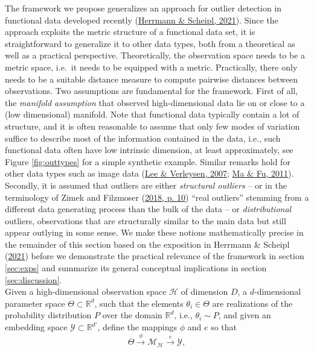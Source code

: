 \documentclass[
  10pt]{article}
\newcommand{\hdspace}{\mathcal{H}}
\newcommand{\embedspace}{\mathcal{Y}}
\newcommand{\pspace}{\Theta}
\newcommand{\mani}{\mathcal{M}}
\newcommand{\obsdim}{\ensuremath{D}}    %
\begin{document}
The framework we propose generalizes an approach for outlier detection in functional data developed recently (\protect\hyperlink{ref-herrmann2021geometric}{Herrmann \& Scheipl, 2021}).
Since the approach exploits the metric structure of a functional data set,
it is straightforward to generalize it to other data types, both from a theoretical as well as a practical perspective. Theoretically, the observation space needs to be a metric space, i.e.~it needs to be equipped with a metric. Practically, there only needs to be a suitable distance measure to compute pairwise distances between observations.
Two assumptions are fundamental for the framework. First of all, the \emph{manifold assumption} that observed high-dimensional data lie on or close to a (low dimensional) manifold.
Note that functional data typically contain a lot of structure, and it is often reasonable to assume that only few modes of variation suffice to describe most of the information contained in the data, i.e., such functional data often have low intrinsic dimension, at least approximately, see Figure \ref{fig:outtypes} for a simple synthetic example. Similar remarks hold for other data types such as image data (\protect\hyperlink{ref-lee2007nonlinear}{Lee \& Verleysen, 2007}; \protect\hyperlink{ref-ma2011manifold}{Ma \& Fu, 2011}). Secondly, it is assumed that outliers are either \emph{structural outliers} -- or in the terminology of Zimek and Filzmoser (\protect\hyperlink{ref-zimek2018there}{2018, p. 10}) ``real outliers'' stemming from a different data generating process than the bulk of the data -- or \emph{distributional} outliers, observations that are structurally similar to the main data but still appear outlying in some sense. We make these notions mathematically precise in the remainder of this section based on the exposition in Herrmann \& Scheipl (\protect\hyperlink{ref-herrmann2021geometric}{2021}) before we demonstrate the practical relevance of the framework in section \ref{sec:exps} and summarize its general conceptual implications in section \ref{sec:discussion}.\\
Given a high-dimensional observation space \(\hdspace\) of dimension \(\obsdim\), a \(d\)-dimensional parameter space \(\pspace \subset \mathbb{R}^d\), such that the elements \(\theta_i \in \pspace\) are realizations of the probability distribution \(P\) over the domain \(\mathbb{R}^d\), i.e., \(\theta_i \sim P\), and given an embedding space \(\embedspace \subset \mathbb{R}^{d'}\), define the mappings \(\phi\) and \(e\) so that
\[\Theta \stackrel{\phi}{\to} \mathcal{\mani_{\hdspace}} \stackrel{e}{\to} \mathcal{Y},\]
\end{document}
